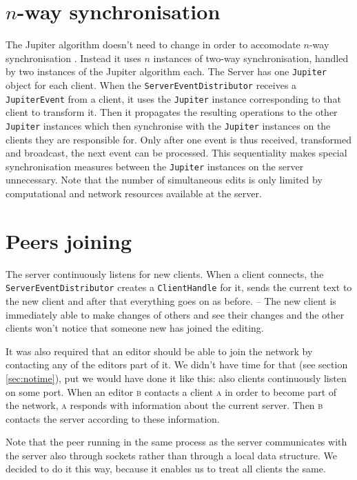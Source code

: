\documentclass[a4paper,final,12pt,oneside,article,table]{memoir}
\newcommand{\mil}[1]{\texttt{#1}}
\begin{document}
\chapter{$n$-way synchronisation}

The Jupiter algorithm doesn't need to change in order to accomodate
$n$-way synchronisation \cite{Jupiter}. Instead it uses $n$ instances of
two-way synchronisation, handled by two instances of the Jupiter
algorithm each. The Server has one \mil{Jupiter} object for each client.
When the \mil{ServerEventDistributor} receives a \mil{JupiterEvent} from
a client, it uses the \mil{Jupiter} instance corresponding to that
client to transform it. Then it propagates the resulting operations to
the other \mil{Jupiter} instances which then synchronise with the
\mil{Jupiter} instances on the clients they are responsible for. Only
after one event is thus received, transformed and broadcast, the next
event can be processed. This sequentiality makes special synchronisation
measures between the \mil{Jupiter} instances on the server unnecessary.
Note that the number of simultaneous edits is only limited by
computational and network resources available at the server.

\chapter{Peers joining}
\label{sec:joining}

The server continuously listens for new clients. When a client connects,
the \mil{ServerEventDistributor} creates a \mil{ClientHandle} for it,
sends the current text to the new client and after that everything goes
on as before. – The new client is immediately able to make changes of
others and see their changes and the other clients won't notice that
someone new has joined the editing.

It was also required that an editor should be able to join the network
by contacting any of the editors part of it. We didn't have time for
that (see section \ref{sec:notime}), put we would have done it like
this: also clients continuously listen on some port. When an editor
\textsc{b} contacts a client \textsc{a} in order to become part of the
network, \textsc{a} responds with information about the current server.
Then \textsc{b} contacts the server according to these information.

Note that the peer running in the same process as the server
communicates with the server also through sockets rather than through a
local data structure. We decided to do it this way, because it enables
us to treat all clients the same.
\end{document}

